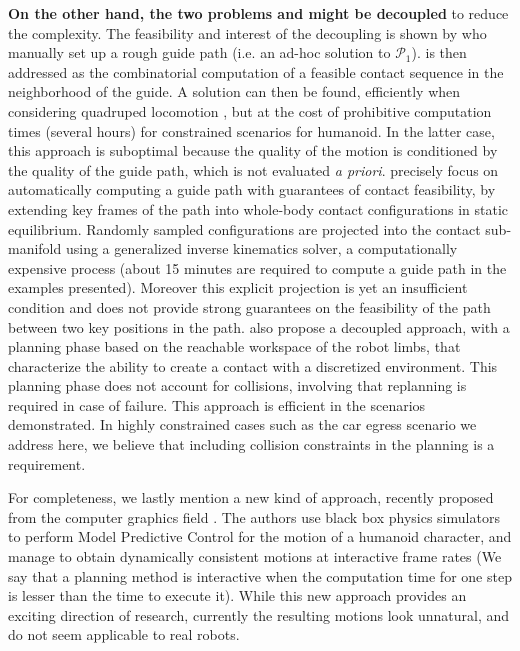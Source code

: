 \textbf{On the other hand, the two problems \Pa and \Pb might be decoupled} to reduce the complexity. The feasibility and interest of the decoupling is shown by \citeauthor{DBLP:conf/iser/EscandeKMG08} who manually set up a rough guide path (i.e. an ad-hoc solution to $\mathcal{P}_1$). \Pb  is then addressed as the combinatorial computation of a feasible contact sequence in the neighborhood of the guide. A solution can then be found, efficiently when considering quadruped locomotion \citep{kalakrishnan2011learning}, but at the cost of prohibitive computation times (several hours) for constrained scenarios for humanoid. In the latter case, this approach is suboptimal because the quality of the motion is conditioned by the quality of the guide path,  which is not evaluated \textit{a priori}. \citeauthor{Bouyarmane2009} precisely focus on automatically computing a guide path with guarantees of contact feasibility, by extending key frames of the path into whole-body contact configurations in static equilibrium. Randomly sampled configurations are projected into the contact sub-manifold using a generalized inverse kinematics solver, a computationally expensive process (about 15 minutes are required to compute a guide path in the examples presented). Moreover this explicit projection is yet an insufficient condition and does not provide strong guarantees on the feasibility of the path between two key positions in the path. \citeauthor{7140082} also propose a decoupled approach, with a planning phase based on the reachable workspace of the robot limbs, that characterize the ability to create a contact with 
a discretized environment. This planning phase does not account for collisions, involving that replanning is required in case of failure. This approach is efficient 
in the scenarios demonstrated. In highly constrained cases such 
as the car egress scenario we address here, we believe that including collision constraints in the planning is a requirement.

For completeness, we lastly mention a new kind of approach, recently proposed from the computer graphics field \citep{hamalainen_cpbp_2015}. The authors
use black box physics simulators to perform Model Predictive Control for the motion of a humanoid character, and manage to obtain dynamically consistent motions
at \gls{interactive} frame rates (We say that a planning method is interactive when the computation time for one step is lesser than the
time to execute it). While this new approach provides an exciting direction of research, currently the resulting motions
look unnatural, and do not seem applicable to real robots.

